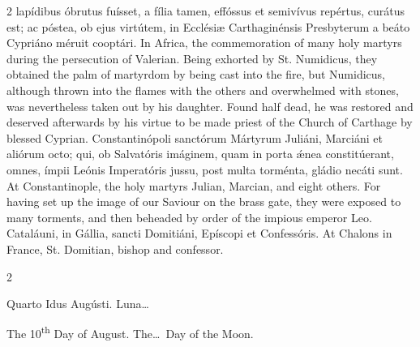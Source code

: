 \begin{paracol}{2}
 lapídibus óbrutus fuísset, a fília tamen, effóssus et semivívus repértus, 
 curátus est; ac póstea, ob ejus virtútem, in Ecclésiæ Carthaginénsis 
 Presbyterum a beáto Cypriáno méruit cooptári.
\switchcolumn
{}
In Africa, the commemoration of many 
 holy martyrs during the persecution of Valerian. Being exhorted by St. 
 Numidicus, they obtained the palm of martyrdom by being cast into the fire, 
 but Numidicus, although thrown into the flames with the others and 
 overwhelmed with stones, was nevertheless taken out by his daughter. 
 Found half dead, he was restored and deserved afterwards by his virtue to be 
 made priest of the Church of Carthage by blessed Cyprian.
\switchcolumn*
{}
Constantinópoli 
 sanctórum Mártyrum Juliáni, Marciáni et aliórum octo; qui, ob Salvatóris 
 imáginem, quam in porta ǽnea constitúerant, omnes, ímpii Leónis Imperatóris 
 jussu, post multa torménta, gládio necáti sunt.
\switchcolumn
{}
At Constantinople, the holy martyrs 
 Julian, Marcian, and eight others. For having set up the image of our 
 Saviour on the brass gate, they were exposed to many torments, and then 
 beheaded by order of the impious emperor Leo.
\switchcolumn*
{}
Cataláuni, in Gállia, 
 sancti Domitiáni, Epíscopi et Confessóris.
\switchcolumn
{}
At Chalons in France, St. Domitian, 
 bishop and confessor.
\switchcolumn*
{}
\end{paracol}


\begin{paracol}{2}
\begin{center}{\color{gregoriocolor} Quarto Idus Augústi. 
 Luna\dots\ }\end{center}
\switchcolumn
{}
\begin{center}{\color{gregoriocolor} The 10\textsuperscript{th} Day of 
 August. The\dots\ Day of the Moon.}\end{center}
\end{paracol}

